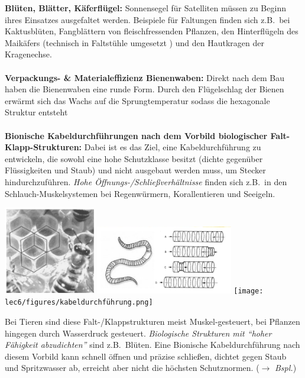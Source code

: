 \textbf{Blüten, Blätter, Käferflügel:} Sonnensegel für Satelliten müssen zu Beginn ihres Einsatzes ausgefaltet werden. Beispiele für Faltungen finden sich z.B.\ bei Kaktusblüten, Fangblättern von fleischfressenden Pflanzen, den Hinterflügeln des Maikäfers (technisch in Faltstühle umgesetzt \dangersign) und den Hautkragen der Kragenechse.
\\\\
\textbf{Verpackungs- \& Materialeffizienz Bienenwaben:} Direkt nach dem Bau haben die Bienenwaben eine runde Form. Durch den Flügelschlag der Bienen erwärmt sich das Wachs auf die Sprungtemperatur sodass die hexagonale Struktur entsteht
\\\\
\textbf{Bionische Kabeldurchführungen nach dem Vorbild biologischer Falt-Klapp-Strukturen:} Dabei ist es das Ziel, eine Kabeldurchführung zu entwickeln, die sowohl eine hohe Schutzklasse besitzt (dichte gegenüber Flüssigkeiten und Staub) und nicht ausgebaut werden muss, um Stecker hindurchzuführen. \textit{Hohe Öffnungs-/Schließverhältnisse} finden sich z.B.\ in den Schlauch-Muskelsystemen bei Regenwürmern, Korallentieren und Seeigeln.

\begin{center}
    \includegraphics[width=4cm]{lec6/figures/biene.png}
    \hfill
    \includegraphics[width=6cm]{lec6/figures/regenwurm.png}
    \hfill
    \texttt{[image: lec6/figures/kabeldurchführung.png]}
\end{center}
Bei Tieren sind diese Falt-/Klappstrukturen meist Muskel-gesteuert,
bei Pflanzen hingegen durch Wasserdruck gesteuert. \textit{Biologische Strukturen mit ``hoher Fähigkeit abzudichten''} sind z.B.\ Blüten. Eine Bionische Kabeldurchführung nach diesem Vorbild kann schnell öffnen und präzise schließen, dichtet gegen Staub und Spritzwasser ab, erreicht aber nicht die höchsten Schutznormen. (\dangersign $\rightarrow$ \textit{Bspl.})

